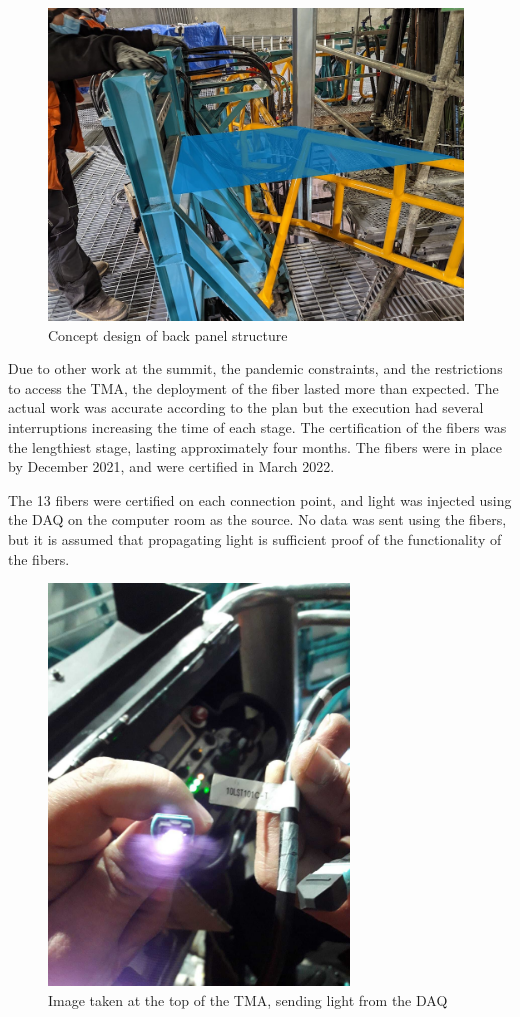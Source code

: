 \label{sec:finaldeployment}
\vspace{10 mm}
\begin{figure}
  \centering
  \includegraphics[width=11cm]{images/back_panel.jpg}
  \caption*{Concept design of back panel structure}
\end{figure}

Due to other work at the summit, the pandemic constraints, and the restrictions to access the TMA, the deployment of the fiber lasted more than expected. The actual work was accurate according to the plan but the execution had several interruptions increasing the time of each stage.
The certification of the fibers was the lengthiest stage, lasting approximately four months. The fibers were in place by December 2021, and were certified in March 2022.

\newpage

The 13 fibers were certified on each connection point, and light was injected using the DAQ on the computer room as the source. No data was sent using the fibers, but it is assumed that propagating light is sufficient proof of the functionality of the fibers. 

\vspace{5 mm}
\begin{figure}
  \centering
  \includegraphics[width=8cm]{images/fiber_certification.jpg}
  \caption*{Image taken at the top of the TMA, sending light from the DAQ}
\end{figure}

